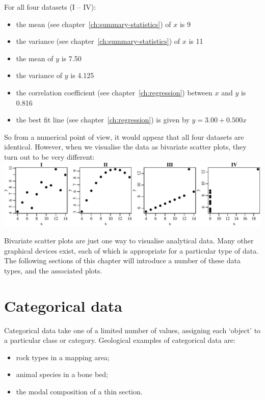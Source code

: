 For all four datasets (I -- IV):

\begin{itemize}\label{pg:anscombe}
\item the mean (see chapter~\ref{ch:summary-statistics}) of $x$ is 9
\item the variance (see chapter~\ref{ch:summary-statistics}) of $x$ is 11
\item the mean of $y$ is 7.50
\item the variance of $y$ is 4.125
\item the correlation coefficient (see chapter~\ref{ch:regression})
  between $x$ and $y$ is 0.816
\item the best fit line (see chapter~\ref{ch:regression}) is given by $y =
  3.00 + 0.500 x$
\end{itemize}

So from a numerical point of view, it would appear that all four
datasets are identical. However, when we visualise the data as
bivariate scatter plots, they turn out to be very different:\\

\noindent\includegraphics[width=\textwidth]{../figures/anscombe.pdf}
\begingroup
{}\label{fig:anscombe}
\endgroup

Bivariate scatter plots are just one way to visualise analytical data.
Many other graphical devices exist, each of which is appropriate for a
particular type of data. The following sections of this chapter will
introduce a number of these data types, and the associated plots.

\section{Categorical data}
\label{sec:categorical}

Categorical data take one of a limited number of values, assigning
each `object' to a particular class or category. Geological examples
of categorical data are:

\begin{itemize}
\item rock types in a mapping area;
\item animal species in a bone bed;
\item the modal composition of a thin section.
\end{itemize}

